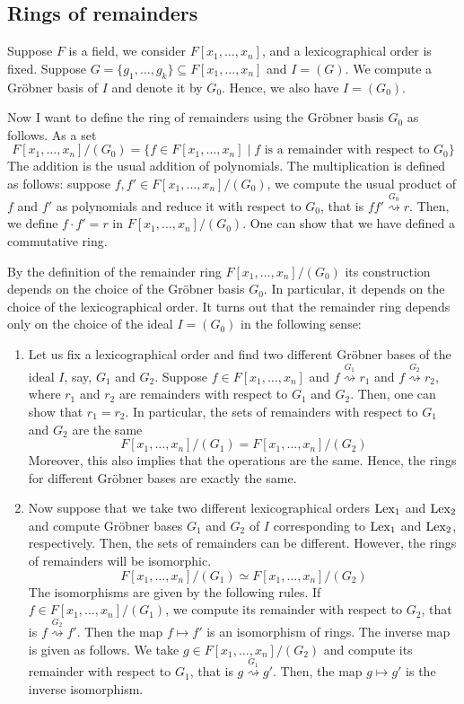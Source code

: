 \subsection{Rings of remainders}

Suppose $F$ is a field, we consider $F[x_1,\ldots,x_n]$, and a lexicographical order is fixed.
Suppose $G = \{g_1,\ldots,g_k\}\subseteq F[x_1,\ldots,x_n]$ and $I = (G)$.
We compute a Gr\"obner basis of $I$ and denote it by $G_0$.
Hence, we also have $I = (G_0)$.

Now I want to define the ring of remainders using the Gr\"obner basis $G_0$ as follows.
As a set
\[
F[x_1,\ldots,x_n]/(G_0) = \{f\in F[x_1,\ldots,x_n]\mid f \text{ is a remainder with respect to }G_0\}
\]
The addition is the usual addition of polynomials.
The multiplication is defined as follows: suppose $f, f'\in F[x_1,\ldots,x_n]/(G_0)$, we compute the usual product of $f$ and $f'$ as polynomials and reduce it with respect to $G_0$, that is $f f' \stackrel{G_0}{\rightsquigarrow} r$.
Then, we define $f \cdot f' = r$ in $F[x_1,\ldots,x_n]/(G_0)$.
One can show that we have defined a commutative ring.

\begin{remarks}
By the definition of the remainder ring $F[x_1,\ldots,x_n]/(G_0)$ its construction depends on the choice of the Gr\"obner basis $G_0$.
In particular, it depends on the choice of the lexicographical order.
It turns out that the remainder ring depends only on the choice of the ideal $I = (G_0)$ in the following sense: 
\begin{enumerate}
\item Let us fix a lexicographical order and find two different Gr\"obner bases of the ideal $I$, say, $G_1$ and $G_2$.
Suppose $f\in F[x_1,\ldots,x_n]$ and $f\stackrel{G_1}{\rightsquigarrow}r_1$ and $f\stackrel{G_2}{\rightsquigarrow}r_2$, where $r_1$ and $r_2$ are remainders with respect to $G_1$ and $G_2$.
Then, one can show that $r_1 = r_2$.
In particular, the sets of remainders with respect to $G_1$ and $G_2$ are the same
\[
F[x_1,\ldots,x_n]/(G_1) = F[x_1,\ldots,x_n]/(G_2)
\]
Moreover, this also implies that the operations are the same.
Hence, the rings for different Gr\"obner bases are exactly the same.

\item Now suppose that we take two different lexicographical orders $\operatorname{Lex}_1$ and $\operatorname{Lex}_2$ and compute Gr\"obner bases $G_1$ and $G_2$ of $I$ corresponding to $\operatorname{Lex}_1$ and $\operatorname{Lex}_2$, respectively.
Then, the sets of remainders can be different.
However, the rings of remainders will be isomorphic.
\[
F[x_1,\ldots,x_n]/(G_1) \simeq F[x_1,\ldots,x_n]/(G_2)
\]
The isomorphisms are given by the following rules.
If $f\in F[x_1,\ldots,x_n]/(G_1)$, we compute its remainder with respect to $G_2$, that is $f\stackrel{G_2}{\rightsquigarrow}f'$.
Then the map $f \mapsto f'$ is an isomorphism of rings.
The inverse map is given as follows.
We take $g\in F[x_1,\ldots,x_n]/(G_2)$ and compute its remainder with respect to $G_1$, that is  $g\stackrel{G_1}{\rightsquigarrow}g'$.
Then, the map $g\mapsto g'$ is the inverse isomorphism.
\end{enumerate}
\end{remarks}

